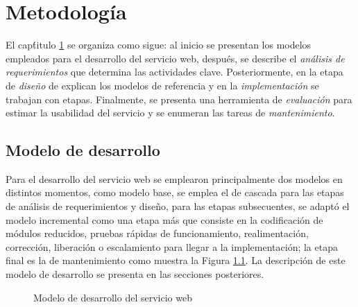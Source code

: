 \renewcommand{\chaptername}{Cap\'itulo}
\chapter{Metodolog\'ia}
\label{Metodologia}

El cap\'titulo \ref{Metodologia} se organiza como sigue: al inicio se presentan  los modelos empleados para el desarrollo del servicio web, despu\'es, se describe el \textit{an\'alisis de requerimientos} que determina las actividades clave. Posteriormente, en la etapa de \textit{dise\~{n}o} de explican los modelos de referencia y en la \textit{implementaci\'on} se trabajan con etapas. Finalmente, se presenta una herramienta de \textit{evaluaci\'on} para estimar la usabilidad del servicio y se enumeran las tareas de \textit{mantenimiento}.

\section{Modelo de desarrollo}

Para el desarrollo del servicio web se emplearon principalmente dos modelos en distintos momentos, como modelo base, se emplea el de cascada \cite{IngDeSW} para las etapas de an\'alisis de requerimientos y dise\~{n}o, para las etapas subsecuentes, se adapt\'o el modelo incremental como una etapa m\'as que consiste en la codificaci\'on de m\'odulos reducidos, pruebas r\'apidas de funcionamiento, realimentaci\'on, correcci\'on, liberaci\'on o escalamiento para llegar a la implementaci\'on; la etapa final es la de mantenimiento como muestra la Figura \ref{modeloDesarrolloSW}. La descripci\'on de este modelo de  desarrollo se presenta en las secciones posteriores. 

\begin{figure}[!ht]
	\centering
    \caption{Modelo de desarrollo del servicio web} %
    \label{modeloDesarrolloSW}
\end{figure}

